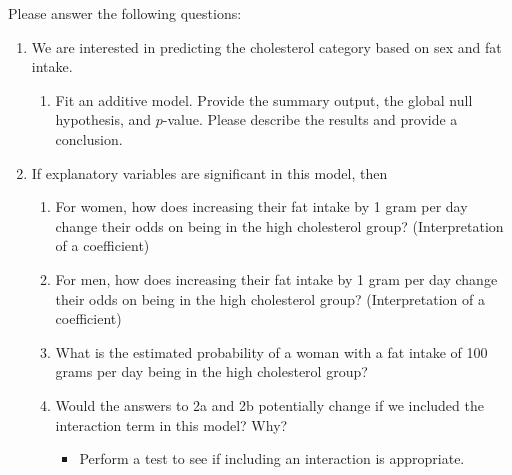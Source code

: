 \documentclass[12pt,letterpaper]{article}
\begin{document}
\newpage
\noindent Please answer the following questions:

\begin{enumerate}
	\item
	We are interested in predicting the cholesterol category based on sex and fat intake.
	\begin{enumerate}
		\item
		Fit an additive model. Provide the summary output, the global null hypothesis, and $p$-value. Please describe the results and provide a conclusion.
	\end{enumerate}
	
	\item
	If explanatory variables are significant in this model, then
	\begin{enumerate}
		\item
		For women, how does increasing their fat intake by 1 gram per day change their odds on being in the high cholesterol group? (Interpretation of a coefficient)
		\item
		For men, how does increasing their fat intake by 1 gram per day change their odds on being in the high cholesterol group? (Interpretation of a coefficient)
		\item
		What is the estimated probability of a woman with a fat intake of 100 grams per day being in the high cholesterol group? 
		\item
		Would the answers to 2a and 2b potentially change if we included the interaction term in this model? Why? 
		\begin{itemize}
			\item Perform a test to see if including an interaction is appropriate.
		\end{itemize}
	
		
	\end{enumerate}
\end{enumerate}
\newpage
\end{document}
